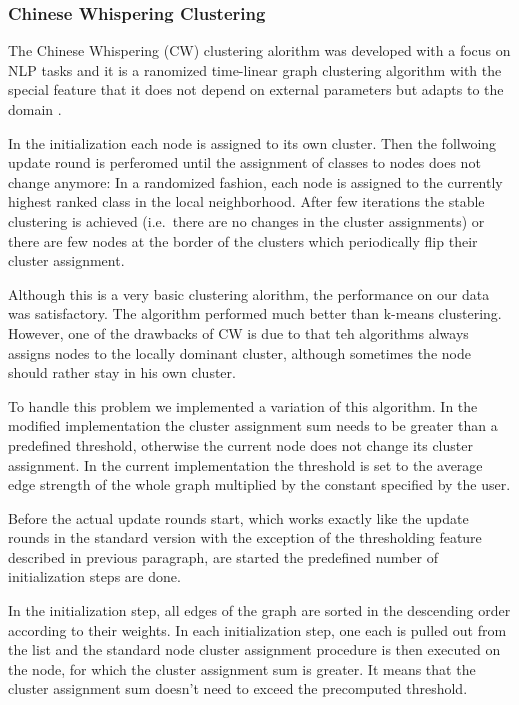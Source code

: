 \subsubsection{Chinese Whispering Clustering}
\label{sec:chinese_whipsering_clustering}
The Chinese Whispering (CW) clustering alorithm was developed with a focus on NLP tasks and it is a
ranomized time-linear graph clustering algorithm with the special feature that it does not depend
on external parameters but adapts to the domain \cite{cw_clustering}.

In the initialization each node is assigned to its own cluster. Then the follwoing update round is
perferomed until the assignment of classes to nodes does not change anymore: In a randomized
fashion, each node is assigned to the currently highest ranked class in the local neighborhood.
After few iterations the stable clustering is achieved (i.e.\ there are no changes in the cluster
assignments) or there are few nodes at the border of the clusters which periodically flip their
cluster assignment.

Although this is a very basic clustering alorithm, the performance on our data was satisfactory. The
algorithm performed much better than k-means clustering. However, one of the drawbacks of CW is due
to that teh algorithms always assigns nodes to the locally dominant cluster, although sometimes the
node should rather stay in his own cluster.

To handle this problem we implemented a variation of this algorithm. In the modified implementation
the cluster assignment sum needs to be greater than a predefined threshold, otherwise the current
node does not change its cluster assignment. In the current implementation the threshold is set to
the average edge strength of the whole graph multiplied by the constant specified by the user.

Before the actual update rounds start, which works exactly like the update rounds in the standard
version with the exception of the thresholding feature described in previous paragraph, are started
the predefined number of initialization steps are done.

In the initialization step, all edges of the graph are sorted in the descending order according to
their weights. In each initialization step, one each is pulled out from the list and the standard
node cluster assignment procedure is then executed on the node, for which the cluster assignment sum
is greater. It means that the cluster assignment sum doesn't need to exceed the precomputed
threshold.

